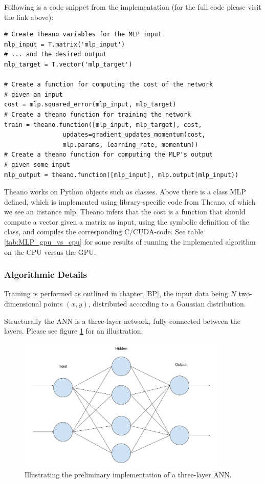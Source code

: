 Following is a code snippet from the implementation (for the full code please visit the link above):

\begin{verbatim}
# Create Theano variables for the MLP input
mlp_input = T.matrix('mlp_input')
# ... and the desired output
mlp_target = T.vector('mlp_target')

# Create a function for computing the cost of the network 
# given an input
cost = mlp.squared_error(mlp_input, mlp_target)
# Create a theano function for training the network
train = theano.function([mlp_input, mlp_target], cost,
                updates=gradient_updates_momentum(cost,
                mlp.params, learning_rate, momentum))
# Create a theano function for computing the MLP's output 
# given some input
mlp_output = theano.function([mlp_input], mlp.output(mlp_input))
\end{verbatim}

Theano works on Python objects such as classes. Above there is a class MLP defined, which is implemented using library-specific code from Theano, of which we see an instance mlp. Theano infers that the cost is a function that should compute a vector given a matrix as input, using the symbolic definition of the class, and compiles the corresponding C/CUDA-code. See table \ref{tab:MLP_gpu_vs_cpu} for some results of running the implemented algorithm on the CPU versus the GPU.


\subsubsection{Algorithmic Details}
Training is performed as outlined in chapter \ref{BP}, the input data being $N$ two-dimensional points $(x, y)$, distributed according to a Gaussian distribution.

Structurally the ANN is a three-layer network, fully connected between the layers. Please see figure \ref{fig:MLP_demo} for an illustration.

\begin{figure}
\centering
\includegraphics[width=10cm]{fig/MLP_demo}
\caption{Illustrating the preliminary implementation of a three-layer ANN.}
\label{fig:MLP_demo}
\end{figure}

